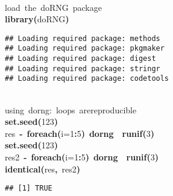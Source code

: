 \documentclass[a4paper,12pt]{article}\usepackage{graphicx, color}
\makeatletter
\newcommand{\hlnumber}[1]{\textcolor[rgb]{0,0,0}{#1}}%
\newcommand{\hlfunctioncall}[1]{\textcolor[rgb]{0.501960784313725,0,0.329411764705882}{\textbf{#1}}}%
\newcommand{\hlkeyword}[1]{\textcolor[rgb]{0,0,0}{\textbf{#1}}}%
\newcommand{\hlargument}[1]{\textcolor[rgb]{0.690196078431373,0.250980392156863,0.0196078431372549}{#1}}%
\newcommand{\hlcomment}[1]{\textcolor[rgb]{0.180392156862745,0.6,0.341176470588235}{#1}}%
\newcommand{\hlassignement}[1]{\textcolor[rgb]{0,0,0}{\textbf{#1}}}%
\newcommand{\hlsymbol}[1]{\textcolor[rgb]{0,0,0}{#1}}%
\newcommand{\hlstd}[1]{\textcolor[rgb]{0,0,0}{#1}}%
\newenvironment{kframe}{%
 \def\FrameCommand##1{\hskip\@totalleftmargin \hskip-\fboxsep
 \colorbox{shadecolor}{##1}\hskip-\fboxsep
     \hskip-\linewidth \hskip-\@totalleftmargin \hskip\columnwidth}%
 \MakeFramed {\advance\hsize-\width
   \@totalleftmargin\z@ \linewidth\hsize
   \@setminipage}}%
 {\par\unskip\endMakeFramed}
\newenvironment{knitrout}{}{} %
\renewenvironment{knitrout}{\begin{footnotesize}}{\end{footnotesize}}
\makeatother
\begin{document}
\begin{knitrout}
\color{fgcolor}\begin{kframe}
\begin{flushleft}
\ttfamily\noindent
\hspace*{\fill}\\
\hlstd{}\hlcomment{\usebox{\hlnormalsizeboxhash}{\ }load{\ }the{\ }doRNG{\ }package}\hspace*{\fill}\\
\hlstd{}\hlfunctioncall{library}\hlkeyword{(}\hlsymbol{doRNG}\hlkeyword{)}\mbox{}
\normalfont
\end{flushleft}
\begin{verbatim}
## Loading required package: methods
## Loading required package: pkgmaker
## Loading required package: digest
## Loading required package: stringr
## Loading required package: codetools
\end{verbatim}
\begin{flushleft}
\ttfamily\noindent
\hspace*{\fill}\\
\hlstd{}\hlcomment{\usebox{\hlnormalsizeboxhash}{\ }using{\ }\usebox{\hlnormalsizeboxpercent}dorng\usebox{\hlnormalsizeboxpercent}:{\ }loops{\ }\usebox{\hlnormalsizeboxunderscore}are\usebox{\hlnormalsizeboxunderscore}{\ }reproducible}\hspace*{\fill}\\
\hlstd{}\hlfunctioncall{set.seed}\hlkeyword{(}\hlnumber{123}\hlkeyword{)}\hspace*{\fill}\\
\hlstd{}\hlsymbol{res}{\ }\hlassignement{\usebox{\hlnormalsizeboxlessthan}-}{\ }\hlfunctioncall{foreach}\hlkeyword{(}\hlargument{i}\hlargument{=}\hlnumber{1}\hlkeyword{:}\hlnumber{5}\hlkeyword{)}{\ }\hlkeyword{\usebox{\hlnormalsizeboxpercent}dorng\usebox{\hlnormalsizeboxpercent}}{\ }\hlkeyword{\usebox{\hlnormalsizeboxopenbrace}}{\ }\hlfunctioncall{runif}\hlkeyword{(}\hlnumber{3}\hlkeyword{)}{\ }\hlkeyword{\usebox{\hlnormalsizeboxclosebrace}}\hspace*{\fill}\\
\hlstd{}\hlfunctioncall{set.seed}\hlkeyword{(}\hlnumber{123}\hlkeyword{)}\hspace*{\fill}\\
\hlstd{}\hlsymbol{res2}{\ }\hlassignement{\usebox{\hlnormalsizeboxlessthan}-}{\ }\hlfunctioncall{foreach}\hlkeyword{(}\hlargument{i}\hlargument{=}\hlnumber{1}\hlkeyword{:}\hlnumber{5}\hlkeyword{)}{\ }\hlkeyword{\usebox{\hlnormalsizeboxpercent}dorng\usebox{\hlnormalsizeboxpercent}}{\ }\hlkeyword{\usebox{\hlnormalsizeboxopenbrace}}{\ }\hlfunctioncall{runif}\hlkeyword{(}\hlnumber{3}\hlkeyword{)}{\ }\hlkeyword{\usebox{\hlnormalsizeboxclosebrace}}\hspace*{\fill}\\
\hlstd{}\hlfunctioncall{identical}\hlkeyword{(}\hlsymbol{res}\hlkeyword{,}{\ }\hlsymbol{res2}\hlkeyword{)}\mbox{}
\normalfont
\end{flushleft}
\begin{verbatim}
## [1] TRUE
\end{verbatim}
\end{kframe}
\end{knitrout}
\end{document}
